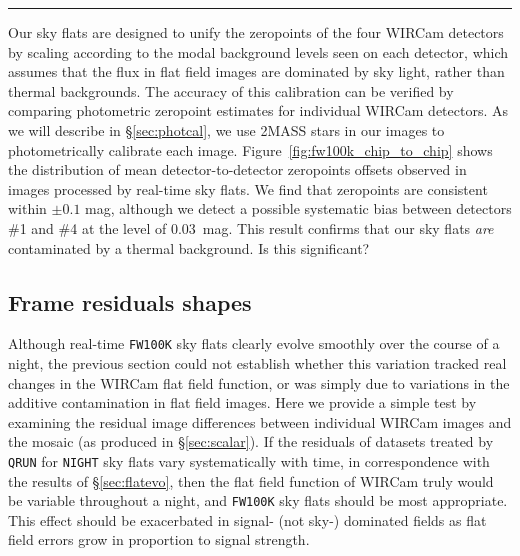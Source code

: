 \documentclass[iop]{emulateapj}
\newcommand{\todo}[1]{\textcolor{BurntOrange}{\textsf{#1}}} %
\newcommand{\mycomment}[1]{\textcolor{OliveGreen}{\textit{#1}}} %
\newcommand{\Fig}[1]{Fig.~\ref{fig:#1}}  %
\newcommand{\Sec}[1]{\S\ref{sec:#1}}  %
\begin{document}
\hrule

Our sky flats are designed to unify the zeropoints of the four WIRCam detectors by scaling according to the modal background levels seen on each detector, which assumes that the flux in flat field images are dominated by sky light, rather than thermal backgrounds.
The accuracy of this calibration can be verified by comparing photometric zeropoint estimates for individual WIRCam detectors.
As we will describe in \Sec{photcal}, we use 2MASS stars in our images to photometrically calibrate each image.
Figure~\ref{fig:fw100k_chip_to_chip} shows the distribution of mean detector-to-detector zeropoints offsets observed in images processed by real-time sky flats. We find that zeropoints are consistent within $\pm 0.1$ mag, although we detect a possible systematic bias between detectors \#1 and \#4 at the level of $0.03$~mag.
This result confirms that our sky flats \emph{are} contaminated by a thermal background.
\todo{Is this significant?}

\subsection{Frame residuals shapes}
\label{sec:frameblockresiduals}

Although real-time \texttt{FW100K} sky flats clearly evolve smoothly over the course of a night, the previous section could not establish whether this variation tracked real changes in the WIRCam flat field function, or was simply due to variations in the additive contamination in flat field images.
Here we provide a simple test by examining the residual image differences between individual WIRCam images and the mosaic (as produced in \Sec{scalar}).
If the residuals of datasets treated by \texttt{QRUN} for \texttt{NIGHT} sky flats vary systematically with time, in correspondence with the results of \Sec{flatevo}, then the flat field function of WIRCam truly would be variable throughout a night, and \texttt{FW100K} sky flats should be most appropriate.
This effect should be exacerbated in signal- (not sky-) dominated fields as flat field errors grow in proportion to signal strength.
\end{document}
